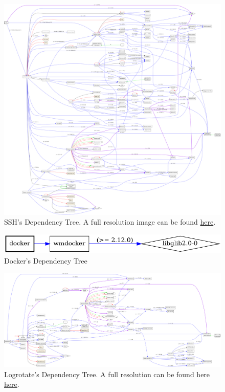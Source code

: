 \begin{figure}[H]
    \centering
    \includegraphics[width=\textwidth]{images/deps/ssh.png}
    \caption{SSH's Dependency Tree. A full resolution image can be found \href{https://raw.githubusercontent.com/antonPalmFolkmann/DevOps2022/main/report/images/deps/ssh.png}{here}.}
    \label{app:fig:ssh_dep_tree}
\end{figure}

\begin{figure}[H]
    \centering
    \includegraphics[width=\textwidth]{images/deps/docker.png}
    \caption{Docker's Dependency Tree}
    \label{app:fig:docker_dep_tree}
\end{figure}

\begin{figure}[H]
    \centering
    \includegraphics[width=\textwidth]{images/deps/logrotate.png}
    \caption{Logrotate's Dependency Tree. A full resolution can be found here \href{https://raw.githubusercontent.com/antonPalmFolkmann/DevOps2022/main/report/images/deps/logrotate.png}{here}.}
    \label{app:fig:logrotate_dep_tree}
\end{figure}

